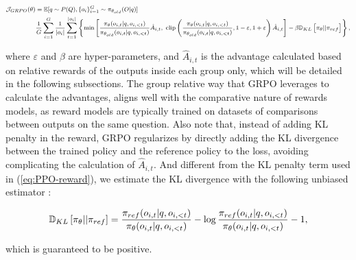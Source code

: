 \begin{itemize}[topsep=0pt]
\begin{itemize}[topsep=0pt]
\begin{equation}
\footnotesize
\begin{split}
    \mathcal{J}_{GRPO}(\theta) &= \mathbb{E}{[q \sim P(Q), \{o_i\}_{i=1}^G \sim \pi_{\theta_{old}}(O|q)]}  \\
    & \frac{1}{G} \sum_{i=1}^G \frac{1}{|o_i|} \sum_{t=1}^{|o_i|} \left\{ \min \left[ \frac{\pi_\theta(o_{i,t} | q, o_{i,<t})}{\pi_{\theta_{old}}(o_{i,t} | q, o_{i,<t})} \hat{A}_{i,t}, \ \text{clip}\left( \frac{\pi_\theta(o_{i,t} | q, o_{i,<t})}{\pi_{\theta_{old}}(o_{i,t} | q, o_{i,<t})}, 1 - \varepsilon, 1 + \varepsilon \right) \hat{A}_{i,t} \right] - \beta \mathbb{D}_{KL}\left[\pi_{\theta} || \pi_{ref}\right] \right\} ,
\end{split}
\label{eq:GRPO-obj}
\end{equation}

where $\varepsilon$ and $\beta$ are hyper-parameters, and $\hat{A}_{i,t}$  is the advantage calculated based on relative rewards of the outputs inside each group only, which will be detailed in the following subsections. The group relative way that GRPO leverages to calculate the advantages, aligns well with the comparative nature of rewards models,  as reward models are typically trained on datasets of comparisons between outputs on the same question. Also note that, instead of adding KL penalty in the reward, GRPO regularizes by directly adding the KL divergence between the trained policy and the reference policy to the loss, avoiding complicating the calculation of  $\hat{A}_{i,t}$. And different from the KL penalty term used in (\ref{eq:PPO-reward}), we estimate the KL divergence with the following unbiased estimator \citep{kl_approx}:

\begin{equation}
\small
    \mathbb{D}_{KL}\left[\pi_{\theta} || \pi_{ref}\right] = \frac{\pi_{ref}(o_{i,t}|q,o_{i,<t})}{\pi_{\theta}(o_{i,t}|q,o_{i,<t})}- \log\frac{\pi_{ref}(o_{i,t}|q,o_{i,<t})}{\pi_{\theta}(o_{i,t}|q,o_{i,<t})} - 1,
\end{equation}

which is guaranteed to be positive.


\end{itemize}
\end{itemize}
